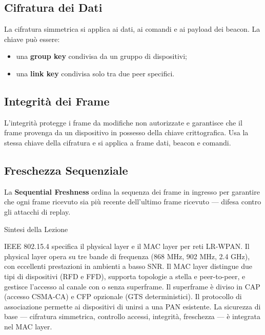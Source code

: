 \documentclass[
  italian,
  openany]{book}
\providecommand{\tightlist}{%
  \setlength{\itemsep}{0pt}\setlength{\parskip}{0pt}}
\begin{document}
\subsection{Cifratura dei Dati}\label{cifratura-dei-dati}

La cifratura simmetrica si applica ai dati, ai comandi e ai payload dei
beacon. La chiave può essere:

\begin{itemize}
\tightlist
\item
  una \textbf{group key} condivisa da un gruppo di dispositivi;
\item
  una \textbf{link key} condivisa solo tra due peer specifici.
\end{itemize}

\subsection{Integrità dei Frame}\label{integrituxe0-dei-frame}

L'integrità protegge i frame da modifiche non autorizzate e garantisce
che il frame provenga da un dispositivo in possesso della chiave
crittografica. Usa la stessa chiave della cifratura e si applica a frame
dati, beacon e comandi.

\subsection{Freschezza Sequenziale}\label{freschezza-sequenziale}

La \textbf{Sequential Freshness} ordina la sequenza dei frame in
ingresso per garantire che ogni frame ricevuto sia più recente
dell'ultimo frame ricevuto --- difesa contro gli attacchi di replay.

\begin{calloutnote}{Sintesi della Lezione}

IEEE 802.15.4 specifica il physical layer e il MAC layer per reti
LR-WPAN. Il physical layer opera su tre bande di frequenza (868 MHz, 902
MHz, 2.4 GHz), con eccellenti prestazioni in ambienti a basso SNR. Il
MAC layer distingue due tipi di dispositivi (RFD e FFD), supporta
topologie a stella e peer-to-peer, e gestisce l'accesso al canale con o
senza superframe. Il superframe è diviso in CAP (accesso CSMA-CA) e CFP
opzionale (GTS deterministici). Il protocollo di associazione permette
ai dispositivi di unirsi a una PAN esistente. La sicurezza di base ---
cifratura simmetrica, controllo accessi, integrità, freschezza --- è
integrata nel MAC layer.

\end{calloutnote}
\end{document}
